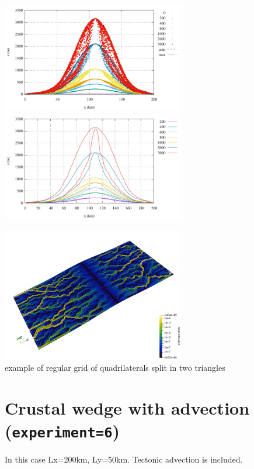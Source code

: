 \begin{center}
\includegraphics[width=8cm]{python_codes/fieldstone_140/results/exp5/elevation.pdf}
\includegraphics[width=8cm]{python_codes/fieldstone_140/results/exp5/elevation2.pdf}
\end{center}

\begin{center}
\includegraphics[width=8cm]{python_codes/fieldstone_140/results/exp5/grid}\\
{\captionfont example of regular grid of quadrilaterals split in two triangles}
\end{center}


\section*{Crustal wedge with advection ({\tt experiment=6})}

In this case Lx=200km, Ly=50km. Tectonic advection is included.

